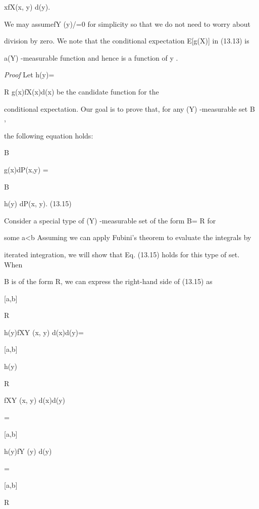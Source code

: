 xfX\vertY (x, y) d\lambda(y).

We may assumefY (y)/=0 for simplicity so that we do not need to worry about

division by zero. We note that the conditional expectation E[g(X)\vertY] in (13.13) is

a\sigma(Y) -measurable function and hence is a function of y .

\textit{Proof} Let h(y)=

\int

R g(x)fX\vertY (x\verty)d\lambda(x) be the candidate function for the

conditional expectation. Our goal is to prove that, for any \sigma(Y) -measurable set B ,

the following equation holds:

\int

B

g(x)dP(x,y) =

\int

B

h(y) dP(x, y). (13.15)

Consider a special type of \sigma(Y) -measurable set of the form B= R \times[ a,b] for

some a<b Assuming we can apply Fubini's theorem to evaluate the integrals by

iterated integration, we will show that Eq. (13.15) holds for this type of set. When

B is of the form R\times[ a,b], we can express the right-hand side of (13.15) as

\int

[a,b]

\int

R

h(y)fXY (x, y) d\lambda(x)d\lambda(y)=

\int

[a,b]

h(y)

\int

R

fXY (x, y) d\lambda(x)d\lambda(y)

=

\int

[a,b]

h(y)fY (y) d\lambda(y)

=

\int

[a,b]

\int

R

